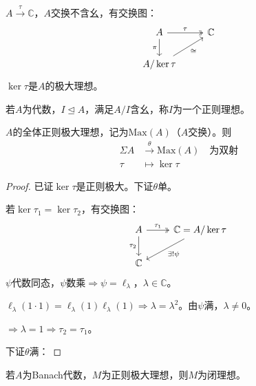 \documentclass[lang=cn,a4paper,newtx,section]{elegantbook}
\begin{document}
\begin{proposition}
  $A \xrightarrow{\tau} \mathbb{C}$，$A$交换不含幺，有交换图：
  \begin{equation*}
    \begin{tikzcd}
      A \arrow[r, "\tau", two heads] \arrow[d, "\pi"'] & \mathbb{C} \\
      A/\ker\tau \arrow[ur, "\cong"'] &
    \end{tikzcd}
  \end{equation*}
  $\ker\tau$是$A$的极大理想。
\end{proposition}

\begin{definition}[正则理想]
  若$A$为代数，$I \trianglelefteq A$，满足$A/I$含幺，称$I$为一个正则理想。
\end{definition}

\begin{proposition}
  $A$的全体正则极大理想，记为$\mathrm{Max}(A)$（$A$交换）。则
  \begin{equation*}
    \begin{aligned}
      \Sigma A &\xrightarrow{\theta} \mathrm{Max}(A) \quad \text{为双射} \\
      \tau &\longmapsto \ker\tau
    \end{aligned}
  \end{equation*}
\end{proposition}

\begin{proof}
  已证$\ker\tau$是正则极大。下证$\theta$单。
  
  若$\ker\tau_1 = \ker\tau_2$，有交换图：
  \begin{equation*}
    \begin{tikzcd}
      A \arrow[r, "\tau_1", two heads] \arrow[d, "\tau_2"'] & \mathbb{C} = A/\ker\tau \arrow[dl, "\exists! \psi"] \\
      \mathbb{C} &
    \end{tikzcd}
  \end{equation*}
  $\psi$代数同态，$\psi$数乘$\Rightarrow \psi = \ell_\lambda$，$\lambda \in \mathbb{C}$。
  
  $\ell_\lambda(1 \cdot 1) = \ell_\lambda(1)\ell_\lambda(1) \Rightarrow \lambda = \lambda^2$。由$\psi$满，$\lambda \neq 0$。
  
  $\Rightarrow \lambda = 1 \Rightarrow \tau_2 = \tau_1$。
  
  下证$\theta$满：
\end{proof}

\begin{proposition}
  若$A$为Banach代数，$M$为正则极大理想，则$M$为闭理想。
\end{proposition}
\end{document}
